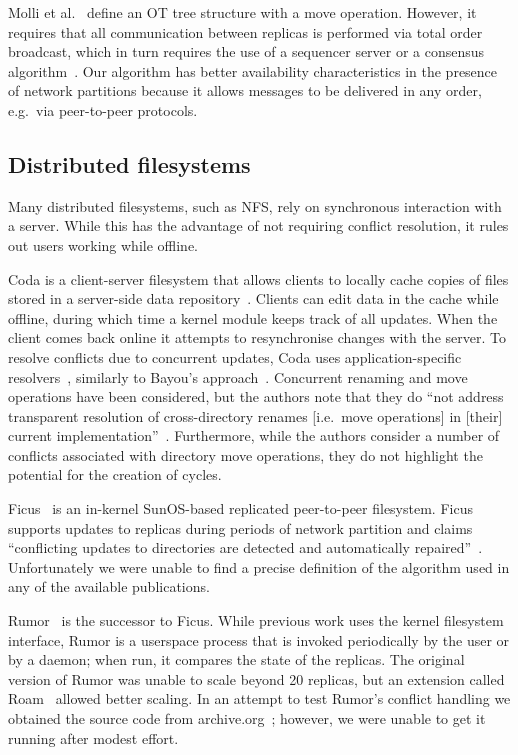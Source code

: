 \documentclass[sigplan,anonymous]{acmart}
\begin{document}
Molli et al.~\cite{Molli:2003cd} define an OT tree structure with a move operation.
However, it requires that all communication between replicas is performed via total order broadcast, which in turn requires the use of a sequencer server or a consensus algorithm~\cite{Chandra:1996cp}.
Our algorithm has better availability characteristics in the presence of network partitions because it allows messages to be delivered in any order, e.g.\ via peer-to-peer protocols.

\subsection{Distributed filesystems}\label{sec:filesystems}

Many distributed filesystems, such as NFS, rely on synchronous interaction with a server.
While this has the advantage of not requiring conflict resolution, it rules out users working while offline.

Coda is a client-server filesystem that allows clients to locally cache copies of files stored in a server-side data repository~\cite{kistler1992coda}. 
Clients can edit data in the cache while offline, during which time a kernel module keeps track of all updates. 
When the client comes back online it attempts to resynchronise changes with the server. 
To resolve conflicts due to concurrent updates, Coda uses application-specific resolvers~\cite{Kumar:1995wf}, similarly to Bayou's approach~\cite{Terry:1995dn}.
Concurrent renaming and move operations have been considered, but the authors note that they do ``not address transparent resolution of cross-directory renames [i.e.\ move operations] in [their] current implementation''~\cite{kumar1993log}.
Furthermore, while the authors consider a number of conflicts associated with directory move operations, they do not highlight the potential for the creation of cycles.

Ficus~\cite{Reiher:1994wh} is an in-kernel SunOS-based replicated peer-to-peer filesystem. 
Ficus supports updates to replicas during periods of network partition and claims ``conflicting updates to directories are detected and automatically repaired''~\cite{guy1990implementation}. 
Unfortunately we were unable to find a precise definition of the algorithm used in any of the available publications. 

Rumor~\cite{Guy:1999gy,RumorManual} is the successor to Ficus.
While previous work uses the kernel filesystem interface, Rumor is a userspace process that is invoked periodically by the user or by a daemon; when run, it compares the state of the replicas.
The original version of Rumor was unable to scale beyond 20 replicas, but an extension called Roam~\cite{Ratner:1999fh} allowed better scaling. 
In an attempt to test Rumor's conflict handling we obtained the source code from archive.org~\cite{RumorSource}; however, we were unable to get it running after modest effort.
\end{document}
